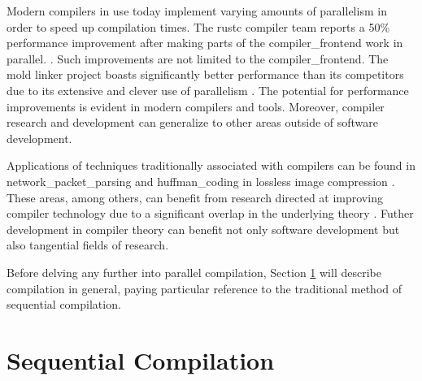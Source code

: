 Modern compilers in use today implement varying amounts of parallelism in order
to speed up compilation times. The \gls{rustc} compiler team reports a 50\%
performance improvement after making parts of the \gls{compiler_frontend} work
in parallel. \citep{nicholas_nethercote_faster_2023}. Such improvements are not
limited to the \gls{compiler_frontend}. The mold \gls{linker} project boasts
significantly better performance than its competitors due to its extensive and
clever use of parallelism \citep{rui_ueyama_design_nodate}. The potential for
performance improvements is evident in modern compilers and tools. Moreover,
compiler research and development can generalize to other areas outside of
software development.

Applications of techniques traditionally associated with compilers can
be found in \gls{network_packet_parsing} \citep{wang_hyperscan_2019,
roesch_snort_1999} and \Gls{huffman_coding} in lossless image compression
\citep{howard_parallel_1996}. These areas, among others, can benefit from
research directed at improving compiler technology due to a significant
overlap in the underlying theory \citep{mytkowicz_data-parallel_2014}. Futher
development in compiler theory can benefit not only software development but
also tangential fields of research.

Before delving any further into parallel compilation, Section \ref {seq_comp}
will describe compilation in general, paying particular reference to the
traditional method of sequential compilation.

\section{Sequential Compilation} \label{seq_comp}

